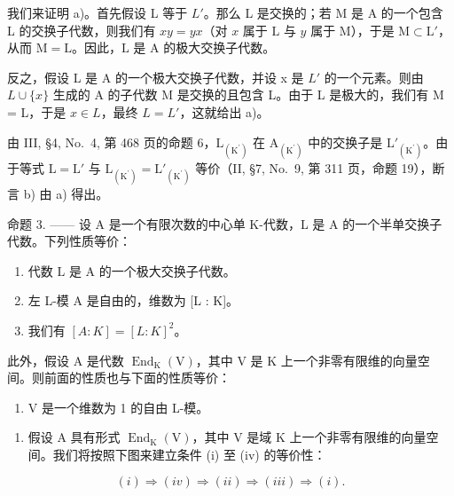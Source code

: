 我们来证明 a)。首先假设 L 等于 \(L'\)。那么 L 是交换的；若 M 是 A 的一个包含 L 的交换子代数，则我们有 \(xy = yx\)（对 \(x\) 属于 \(\mathrm{L}\) 与 \(y\) 属于 \(\mathrm{M}\)），于是 \(\mathrm{M} \subset \mathrm{L}'\)，从而 \(\mathrm{M} = \mathrm{L}\)。因此，\(\mathrm{L}\) 是 \(\mathrm{A}\) 的极大交换子代数。

反之，假设 L 是 A 的一个极大交换子代数，并设 x 是 \(L'\) 的一个元素。则由 \(L \cup \{x\}\) 生成的 A 的子代数 M 是交换的且包含 L。由于 L 是极大的，我们有 M = L，于是 \(x \in L\)，最终 \(L = L'\)，这就给出 a)。

由 III, §4, No.~4, 第 468 页的命题 6，\(\mathrm{L}_{(\mathrm{K}^{\prime})}\) 在 \(\mathrm{A}_{(\mathrm{K}^{\prime})}\) 中的交换子是 \(\mathrm{L}'_{(\mathrm{K}^{\prime})}\)。由于等式 \(\mathrm{L} = \mathrm{L}'\) 与 \(\mathrm{L}_{(\mathrm{K}^{\prime})} = \mathrm{L}'_{(\mathrm{K}^{\prime})}\) 等价（II, §7, No.~9, 第 311 页，命题 19），断言 b) 由 a) 得出。

命题 3. —— 设 A 是一个有限次数的中心单 K-代数，L 是 A 的一个半单交换子代数。下列性质等价：

\begin{enumerate}
\def\labelenumi{(\roman{enumi})}
\item
  代数 \(\mathrm{L}\) 是 \(\mathrm{A}\) 的一个极大交换子代数。
\item
  左 L-模 A 是自由的，维数为 {[}L : K{]}。
\item
  我们有 \([A:K]=[L:K]^{2}\)。
\end{enumerate}

此外，假设 A 是代数 \(\operatorname{End}_{\mathrm{K}}(\mathrm{V})\)，其中 V 是 K 上一个非零有限维的向量空间。则前面的性质也与下面的性质等价：

\begin{enumerate}
\def\labelenumi{(\roman{enumi})}
\setcounter{enumi}{3}
\tightlist
\item
  V 是一个维数为 1 的自由 L-模。
\end{enumerate}

\begin{enumerate}
\def\labelenumi{\Alph{enumi})}
\tightlist
\item
  假设 A 具有形式 \(\operatorname{End}_{\mathrm{K}}(\mathrm{V})\)，其中 V 是域 K 上一个非零有限维的向量空间。我们将按照下图来建立条件 (i) 至 (iv) 的等价性：
\end{enumerate}

\[
(i) \Longrightarrow (i v) \Longrightarrow (i i) \Longrightarrow (i i i) \Longrightarrow (i).
\]

